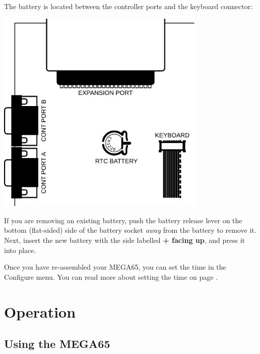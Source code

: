 The battery is located between the controller ports and the keyboard connector:

\includegraphics[width=10cm]{images/illustrations/rtc-battery-location.pdf}

If you are removing an existing battery, push the battery release lever on the bottom (flat-sided) side of the
battery socket \textit{away} from the battery to remove it. Next, insert the new battery with the side labelled
{\bf + facing up}, and press it into place.

Once you have re-assembled your MEGA65, you can set the time in the Configure menu. You can read more about setting
the time on page \pageref{configuring-chipset}.




\section{Operation}

\subsection{Using the MEGA65}

